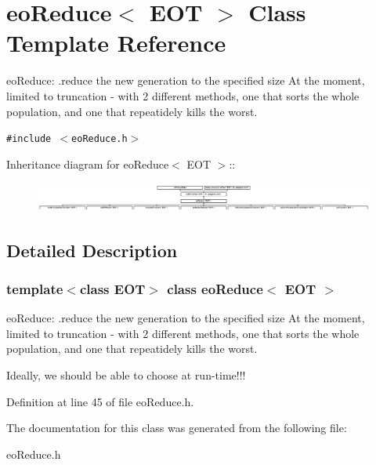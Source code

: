\section{eo\-Reduce$<$ EOT $>$ Class Template Reference}
\label{classeo_reduce}
eo\-Reduce: .reduce the new generation to the specified size At the moment, limited to truncation - with 2 different methods, one that sorts the whole population, and one that repeatidely kills the worst.  


{\tt \#include $<$eo\-Reduce.h$>$}

Inheritance diagram for eo\-Reduce$<$ EOT $>$::\begin{figure}[H]
\begin{center}
\leavevmode
\includegraphics[height=0.987654cm]{classeo_reduce}
\end{center}
\end{figure}


\subsection{Detailed Description}
\subsubsection*{template$<$class EOT$>$ class eo\-Reduce$<$ EOT $>$}

eo\-Reduce: .reduce the new generation to the specified size At the moment, limited to truncation - with 2 different methods, one that sorts the whole population, and one that repeatidely kills the worst. 

Ideally, we should be able to choose at run-time!!! 



Definition at line 45 of file eo\-Reduce.h.

The documentation for this class was generated from the following file:\begin{CompactItemize}
\item 
eo\-Reduce.h\end{CompactItemize}
